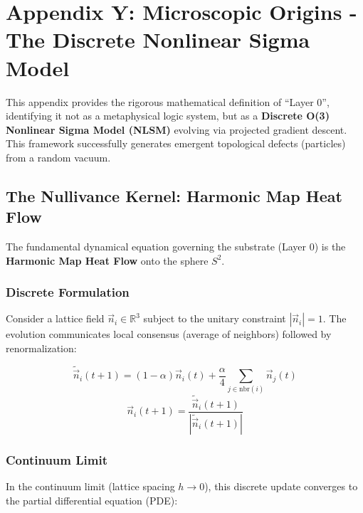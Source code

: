 \section{Appendix Y: Microscopic Origins - The Discrete Nonlinear Sigma Model}
\label{app:layer0}

This appendix provides the rigorous mathematical definition of ``Layer 0'', identifying it not as a metaphysical logic system, but as a \textbf{Discrete O(3) Nonlinear Sigma Model (NLSM)} evolving via projected gradient descent. This framework successfully generates emergent topological defects (particles) from a random vacuum.

\subsection{The Nullivance Kernel: Harmonic Map Heat Flow}

The fundamental dynamical equation governing the substrate (Layer 0) is the \textbf{Harmonic Map Heat Flow} onto the sphere $S^2$.

\subsubsection{Discrete Formulation}
Consider a lattice field $\vec{n}_i \in \mathbb{R}^3$ subject to the unitary constraint $|\vec{n}_i| = 1$. The evolution communicates local consensus (average of neighbors) followed by renormalization:

\begin{equation}
    \tilde{\vec{n}}_i(t+1) = (1-\alpha)\vec{n}_i(t) + \frac{\alpha}{4}\sum_{j \in \text{nbr}(i)} \vec{n}_j(t)
\end{equation}
\begin{equation}
    \vec{n}_i(t+1) = \frac{\tilde{\vec{n}}_i(t+1)}{|\tilde{\vec{n}}_i(t+1)|}
\end{equation}

\subsubsection{Continuum Limit}
In the continuum limit (lattice spacing $h \to 0$), this discrete update converges to the partial differential equation (PDE):


